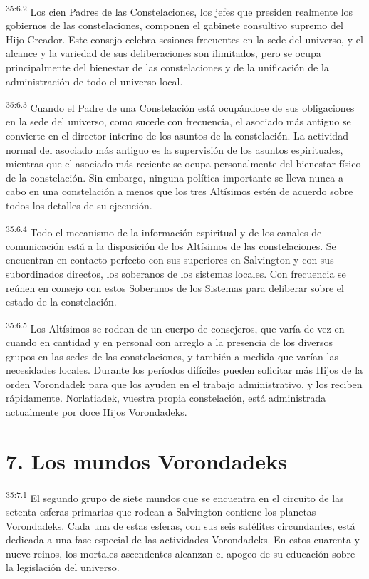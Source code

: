 \par
\textsuperscript{35:6.2} Los cien Padres de las Constelaciones, los jefes que presiden realmente los gobiernos de las constelaciones, componen el gabinete consultivo supremo del Hijo Creador. Este consejo celebra sesiones frecuentes en la sede del universo, y el alcance y la variedad de sus deliberaciones son ilimitados, pero se ocupa principalmente del bienestar de las constelaciones y de la unificación de la administración de todo el universo local.

\par
\textsuperscript{35:6.3} Cuando el Padre de una Constelación está ocupándose de sus obligaciones en la sede del universo, como sucede con frecuencia, el asociado más antiguo se convierte en el director interino de los asuntos de la constelación. La actividad normal del asociado más antiguo es la supervisión de los asuntos espirituales, mientras que el asociado más reciente se ocupa personalmente del bienestar físico de la constelación. Sin embargo, ninguna política importante se lleva nunca a cabo en una constelación a menos que los tres Altísimos estén de acuerdo sobre todos los detalles de su ejecución.

\par
\textsuperscript{35:6.4} Todo el mecanismo de la información espiritual y de los canales de comunicación está a la disposición de los Altísimos de las constelaciones. Se encuentran en contacto perfecto con sus superiores en Salvington y con sus subordinados directos, los soberanos de los sistemas locales. Con frecuencia se reúnen en consejo con estos Soberanos de los Sistemas para deliberar sobre el estado de la constelación.

\par
\textsuperscript{35:6.5} Los Altísimos se rodean de un cuerpo de consejeros, que varía de vez en cuando en cantidad y en personal con arreglo a la presencia de los diversos grupos en las sedes de las constelaciones, y también a medida que varían las necesidades locales. Durante los períodos difíciles pueden solicitar más Hijos de la orden Vorondadek para que los ayuden en el trabajo administrativo, y los reciben rápidamente. Norlatiadek, vuestra propia constelación, está administrada actualmente por doce Hijos Vorondadeks.

\section*{7. Los mundos Vorondadeks}
\par
\textsuperscript{35:7.1} El segundo grupo de siete mundos que se encuentra en el circuito de las setenta esferas primarias que rodean a Salvington contiene los planetas Vorondadeks. Cada una de estas esferas, con sus seis satélites circundantes, está dedicada a una fase especial de las actividades Vorondadeks. En estos cuarenta y nueve reinos, los mortales ascendentes alcanzan el apogeo de su educación sobre la legislación del universo.

